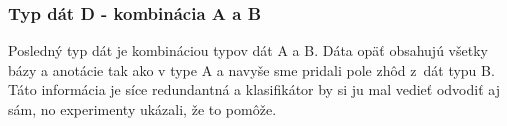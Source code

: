 

\subsubsection{Typ dát D - kombinácia A a B}

Posledný typ dát je kombináciou typov dát A a B. Dáta opäť obsahujú všetky bázy a anotácie tak ako v type A a navyše sme pridali pole zhôd z~dát typu B. Táto informácia je síce redundantná a klasifikátor by si ju mal vedieť odvodiť aj sám, no experimenty ukázali, že to pomôže.

